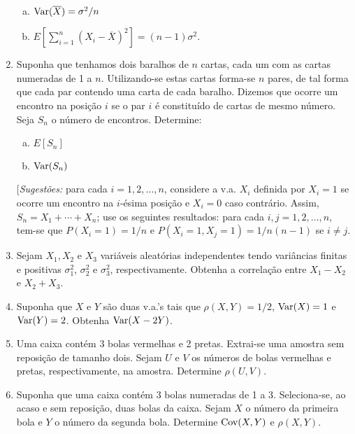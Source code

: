 \documentclass[../Notas.tex]{subfiles}
\begin{document}
\begin{enumerate}
\begin{enumerate}[a)]
    \item $\text{Var}(\overline{X}) = \sigma^2/n$
    \item $E \left[ \sum_{i=1}^n (X_i - \overline{X})^2 \right] = (n - 1)\sigma^2$.
    \end{enumerate}
    \item Suponha que tenhamos dois baralhos de $n$ cartas, cada um com as cartas numeradas de 1 a $n$. Utilizando-se estas cartas forma-se $n$ pares, de tal forma que cada par contendo uma carta de cada baralho. Dizemos que ocorre um encontro na posição $i$ se o par $i$ é constituído de cartas de mesmo número. Seja $S_n$ o número de encontros. Determine:
    \begin{enumerate}[a)]
    \item $E[S_n]$
    \item $\text{Var}(S_n)$
    \end{enumerate}
    [\textit{Sugestões:} para cada $i = 1,2,\dots, n$, considere a v.a. $X_i$ definida por $X_i = 1$ se ocorre um encontro na $i$-ésima posição e $X_i = 0$ caso contrário. Assim, $S_n = X_1 + \cdots + X_n$; use os seguintes resultados: para cada $i, j = 1,2,\dots,n$, tem-se que $P(X_i = 1) = 1/n$ e $P(X_i = 1, X_j = 1) = 1/n(n-1)$ se $i\neq j$.
    \item Sejam $X_1, X_2$ e $X_3$ variáveis aleatórias independentes tendo variâncias finitas e positivas $\sigma_1^2$, $\sigma_2^2$ e $\sigma_3^2$, respectivamente. Obtenha a correlação entre $X_1 - X_2$ e $X_2 + X_3$.
    \item Suponha que $X$ e $Y$ são duas v.a.’s tais que $\rho(X,Y) = 1/2$, $\text{Var}(X) = 1$ e $\text{Var}(Y) = 2$. Obtenha $\text{Var}(X - 2Y)$.
    \item Uma caixa contém 3 bolas vermelhas e 2 pretas. Extrai-se uma amostra sem reposição de tamanho dois. Sejam $U$ e $V$ os números de bolas vermelhas e pretas, respectivamente, na amostra. Determine $\rho(U, V)$.
    \item Suponha que uma caixa contém 3 bolas numeradas de 1 a 3. Seleciona-se, ao acaso e sem reposição, duas bolas da caixa. Sejam $X$ o número da primeira bola e $Y$ o número da segunda bola. Determine $\text{Cov}(X, Y)$ e $\rho(X, Y)$.
\end{enumerate}
\end{document}
